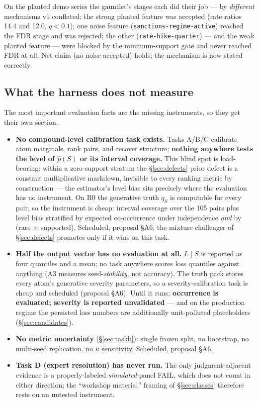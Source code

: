 \documentclass[11pt]{article}
\begin{document}
On the planted demo series the gauntlet's stages each did their job --- by
\emph{different} mechanisms v1 conflated: the strong planted feature was
accepted (rate ratios 14.4 and 12.0, $q < 0.1$); one noise feature
(\texttt{sanctions-regime-active}) reached the FDR stage and was rejected;
the other (\texttt{rate-hike-quarter}) --- and the weak planted feature ---
were blocked by the minimum-support gate and never reached FDR at all. Net
claim (no noise accepted) holds; the mechanism is now stated correctly.

\subsection{What the harness does not measure}
\label{sec:notmeasured}

The most important evaluation facts are the missing instruments, so they get
their own section.

\begin{itemize}[leftmargin=1.4em]
\item \textbf{No compound-level calibration task exists.} Tasks A/B/C
  calibrate atom marginals, rank pairs, and recover structure;
  \textbf{nothing anywhere tests the level of $\hat p(S)$ or its interval
  coverage.} This blind spot is load-bearing: within a zero-support stratum
  the \S\ref{sec:defects} prior defect is a constant multiplicative
  markdown, invisible to every ranking metric by construction --- the
  estimator's level bias sits precisely where the evaluation has no
  instrument. On R0 the generative truth $q_S$ is computable for every
  pair, so the instrument is cheap: interval coverage over the 105 pairs
  plus level bias stratified by expected co-occurrence under independence
  \emph{and} by (rare $\times$ supported). Scheduled, proposal \S A6; the
  mixture challenger of \S\ref{sec:defects} promotes only if it wins on
  this task.
\item \textbf{Half the output vector has no evaluation at all.} $L \mid S$
  is reported as four quantiles and a mean; no task anywhere scores loss
  quantiles against anything (A3 measures seed-\emph{stability}, not
  accuracy). The truth pack stores every atom's generative severity
  parameters, so a severity-calibration task is cheap and scheduled
  (proposal \S A6). Until it runs: \textbf{occurrence is evaluated;
  severity is reported unvalidated} --- and on the production regime the
  persisted loss numbers are additionally unit-polluted placeholders
  (\S\ref{sec:candidates}).
\item \textbf{No metric uncertainty} (\S\ref{sec:taskb}): single frozen
  split, no bootstrap, no multi-seed replication, no $\kappa$ sensitivity.
  Scheduled, proposal \S A6.
\item \textbf{Task D (expert resolution) has never run.} The only
  judgment-adjacent evidence is a properly-labeled \emph{simulated}-panel
  FAIL, which does not count in either direction; the ``workshop material''
  framing of \S\ref{sec:classes} therefore rests on an untested instrument.
\end{itemize}
\end{document}
